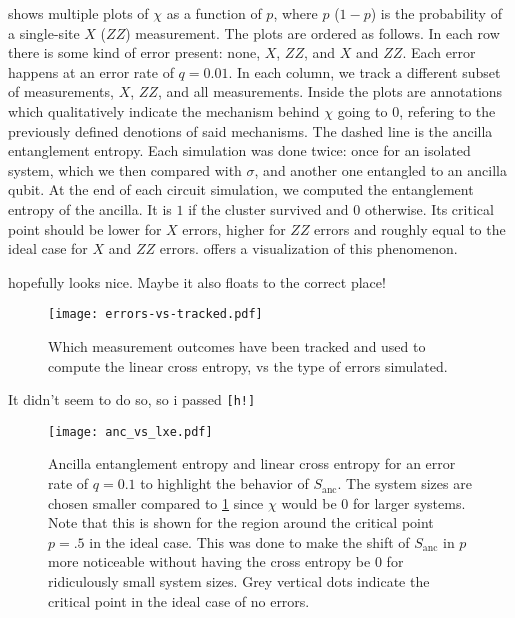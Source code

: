  shows multiple plots of $\chi$ as a function of
$p$, where $p$ ($1-p$) is the probability of a single-site $X$ ($ZZ$)
measurement. The plots are ordered as follows. In each row there is some kind of
error present: none, $X$, $ZZ$, and $X$ and $ZZ$. Each error happens at an
error rate of $q=0.01$. In each column, we track a different subset of
measurements, $X$, $ZZ$, and all measurements.
Inside the plots are annotations which qualitatively
indicate the mechanism behind $\chi$ going to $0$, refering to the previously
defined denotions of said mechanisms. The dashed line is the ancilla
entanglement entropy. Each simulation was done twice: once for an isolated
system, which we then compared with $\sigma$, and another one entangled to an
ancilla qubit. At the end of each circuit simulation, we computed the
entanglement entropy of the ancilla. It is $1$ if the cluster survived and $0$
otherwise. Its critical point should be lower for $X$ errors, higher for $ZZ$
errors and roughly equal to the ideal case for $X$ and $ZZ$ errors.
 offers a visualization of this phenomenon.
 

 hopefully looks nice. Maybe it also floats to the correct
place!
\begin{figure}[h!]
  \centering
  \texttt{[image: errors-vs-tracked.pdf]}
  \caption{Which measurement outcomes have been tracked and used to compute the
  linear cross entropy, vs the type of errors simulated.}
  \label{fig:err-vs-tra}
\end{figure}
It didn't seem to do so, so i passed \texttt{[h!]}

\begin{figure}[h]
  \centering
  \texttt{[image: anc\_vs\_lxe.pdf]}
  \caption{Ancilla entanglement entropy and linear cross entropy for an error
  rate of $q=0.1$ to highlight the behavior of $S_\mathrm{anc}$. The system sizes are chosen smaller compared to
\cref{fig:err-vs-tra} since $\chi$ would be $0$ for larger systems. Note that
this is shown for the region around the critical point $p=.5$ in the ideal
case. This was done to make the shift of $S_\mathrm{anc}$ in $p$ more
noticeable without having the cross entropy be $0$ for ridiculously small
system sizes. Grey vertical dots indicate the critical point in the ideal case
of no errors.}
  \label{fig:large-q-anc-vs-lxe}
\end{figure}
